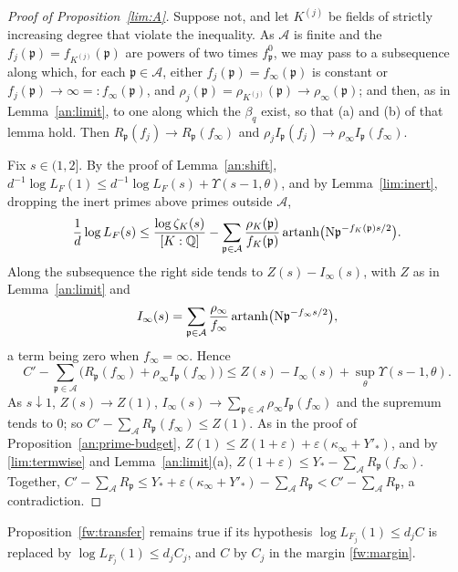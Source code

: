 \begin{proof}[Proof of Proposition~\ref{lim:A}]
Suppose not, and let $K^{(j)}$ be fields of strictly increasing degree that
violate the inequality. As $\mathcal A$ is finite and the
$f_j(\mathfrak p)=f_{K^{(j)}}(\mathfrak p)$ are powers of two times
$f^0_{\mathfrak p}$, we may pass to a subsequence along which, for each
$\mathfrak p\in\mathcal A$, either $f_j(\mathfrak p)=f_\infty(\mathfrak p)$ is
constant or $f_j(\mathfrak p)\to\infty=:f_\infty(\mathfrak p)$, and
$\rho_j(\mathfrak p)=\rho_{K^{(j)}}(\mathfrak p)\to\rho_\infty(\mathfrak p)$;
and then, as in Lemma~\ref{an:limit}, to one along which the $\beta_q$ exist,
so that (a) and (b) of that lemma hold. Then $R_{\mathfrak p}(f_j)\to
R_{\mathfrak p}(f_\infty)$ and $\rho_jI_{\mathfrak p}(f_j)\to\rho_\infty
I_{\mathfrak p}(f_\infty)$.

Fix $s\in(1,2]$. By the proof of Lemma~\ref{an:shift},
$d^{-1}\log L_F(1)\le d^{-1}\log L_F(s)+\Upsilon(s-1,\theta)$, and by
Lemma~\ref{lim:inert}, dropping the inert primes above primes outside
$\mathcal A$,
\[
 \frac1d\log L_F(s)\le\frac{\log\zeta_K(s)}{[K:\mathbb Q]}-\sum_{\mathfrak p\in\mathcal A}
 \frac{\rho_K(\mathfrak p)}{f_K(\mathfrak p)}
 \operatorname{artanh}\bigl(\mathrm N\mathfrak p^{-f_K(\mathfrak p)s/2}\bigr).
\]
Along the subsequence the right side tends to $Z(s)-I_\infty(s)$, with $Z$ as
in Lemma~\ref{an:limit} and
\[
 I_\infty(s)=\sum_{\mathfrak p\in\mathcal A}\frac{\rho_\infty}{f_\infty}
 \operatorname{artanh}\bigl(\mathrm N\mathfrak p^{-f_\infty s/2}\bigr),
\]
a term being zero when $f_\infty=\infty$. Hence
\[
 C'-\sum_{\mathfrak p\in\mathcal A}\bigl(R_{\mathfrak p}(f_\infty)+\rho_\infty
 I_{\mathfrak p}(f_\infty)\bigr)\le Z(s)-I_\infty(s)+\sup_\theta\Upsilon(s-1,\theta).
\]
As $s\downarrow1$, $Z(s)\to Z(1)$, $I_\infty(s)\to\sum_{\mathfrak p\in\mathcal A}
\rho_\infty I_{\mathfrak p}(f_\infty)$ and the supremum tends to $0$; so
$C'-\sum_{\mathcal A}R_{\mathfrak p}(f_\infty)\le Z(1)$. As in the proof of
Proposition~\ref{an:prime-budget},
$Z(1)\le Z(1+\varepsilon)+\varepsilon(\kappa_\infty+Y'_*)$, and by
\eqref{lim:termwise} and Lemma~\ref{an:limit}(a),
$Z(1+\varepsilon)\le Y_*-\sum_{\mathcal A}R_{\mathfrak p}(f_\infty)$. Together,
$C'-\sum_{\mathcal A}R_{\mathfrak p}\le Y_*+\varepsilon(\kappa_\infty+Y'_*)
-\sum_{\mathcal A}R_{\mathfrak p}<C'-\sum_{\mathcal A}R_{\mathfrak p}$, a
contradiction.
\end{proof}

\begin{lemma}\label{lim:transfer-C}
Proposition~\ref{fw:transfer} remains true if its hypothesis
$\log L_{F_j}(1)\le d_jC$ is replaced by $\log L_{F_j}(1)\le d_jC_j$, and $C$ by
$C_j$ in the margin \eqref{fw:margin}.
\end{lemma}

